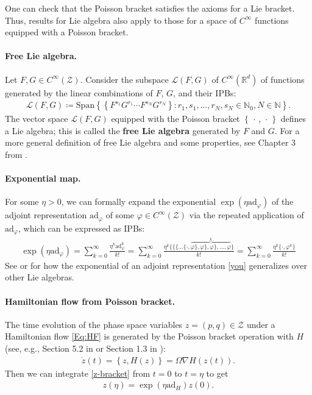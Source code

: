 \documentclass[11pt]{article}
\newcommand{\R}{\mathbb{R}}
\newcommand{\Z}{\mathcal{Z}}
\newcommand{\N}{\mathbb{N}}
\newcommand{\ad}{\mathrm{ad}}
\begin{document}
One can check that the Poisson bracket satisfies the axioms for a Lie bracket. Thus, results for Lie algebra also apply to those for a space of $C^{\infty}$ functions equipped with a Poisson bracket.

\paragraph{Free Lie algebra.}
Let $F,G\in C^{\infty}(\Z)$. 
Consider the subspace $\mathcal{L}\left(F,G\right)$ of $C^{\infty}\left(\R^{d}\right)$ of functions generated by the linear combinations of $F$, $G$, and their IPBs: 
\begin{align}\label{Eq:FreeLieAlgebra}
    \mathcal{L}\left(F,G\right) \coloneqq  \text{Span}\left\{\left\{F^{s_{1}}G^{r_{1}}\cdots F^{s_{N}}G^{r_{N}}\right\} \colon r_{1},s_{1},\dots,r_{N},s_{N}\in\N_0, N\in\N\right\}.
\end{align}
The vector space $\mathcal{L}\left(F,G\right)$ equipped with the Poisson bracket $\left\{\,\cdot\,,\,\cdot\,\right\}$ defines a Lie algebra; this is called the {\bf free Lie algebra} generated by $F$ and $G$. For a more general definition of free Lie algebra and some properties, see Chapter 3 from \cite{Varadarajan1984}.

\paragraph{Exponential map.}
For some $\eta>0$, we can formally expand the exponential $\exp\left(\eta\ad_{\varphi}\right)$ of the adjoint representation $\ad_{\varphi}$ of some $\varphi\in C^{\infty}\left(\Z\right)$ via the repeated application of $\ad_{\varphi}$, which can be expressed as IPBs:
\begin{gather}
    \exp\left(\eta\ad_{\varphi}\right)=\sum_{k=0}^{\infty}{\frac{\eta^{k}\ad_{\varphi}^{k}}{k!}}=\sum_{k=0}^{\infty}{\frac{\eta^{k}\{\{\{...\{\cdot,\overbrace{\varphi\},\varphi\},\varphi\},..., \varphi}^{k}\}}{k!}} = \sum_{k=0}^{\infty}{\frac{\eta^{k}\{\cdot, \varphi^k\}}{k!}}\label{you}
\end{gather}
See \cite[][Chapter 2]{Varadarajan1984} or \cite[][Chapters 3-5]{Hall2015} for how the exponential of an adjoint representation \eqref{you} generalizes over other Lie algebras.

\paragraph{Hamiltonian flow from Poisson bracket.}
The time evolution of the phase space variables $z=\left(p,q\right)\in\Z$ under a Hamiltonian flow \eqref{Eq:HF} is generated by the Poisson bracket operation with $H$ (see, e.g., Section 5.2 in \cite{Jose1998} or Section 1.3 in \cite{Arnold2006}):
\begin{gather}
    \dot z(t)=\left\{z,H(z)\right\}=\Omega\nabla H\left(z(t)\right).\label{z-bracket}
\end{gather}
Then we can integrate \eqref{z-bracket} from $t=0$ to $t=\eta$ to get
\begin{gather}
z(\eta)=\exp\left(\eta\ad_{H}\right)z(0).\label{expexp}
\end{gather}
\end{document}
